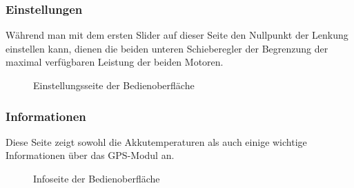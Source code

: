 \subsubsection{Einstellungen}
Während man mit dem ersten Slider auf dieser Seite den Nullpunkt der Lenkung einstellen kann, 
dienen die beiden unteren Schieberegler der Begrenzung der maximal verfügbaren Leistung der beiden Motoren.
\begin{figure}[h]
    \caption{Einstellungsseite der Bedienoberfläche}
\end{figure}
\newpage

\subsubsection{Informationen}
Diese Seite zeigt sowohl die Akkutemperaturen als auch einige wichtige Informationen über das GPS-Modul an.
\begin{figure}[h]
    \caption{Infoseite der Bedienoberfläche}
\end{figure}
\newpage